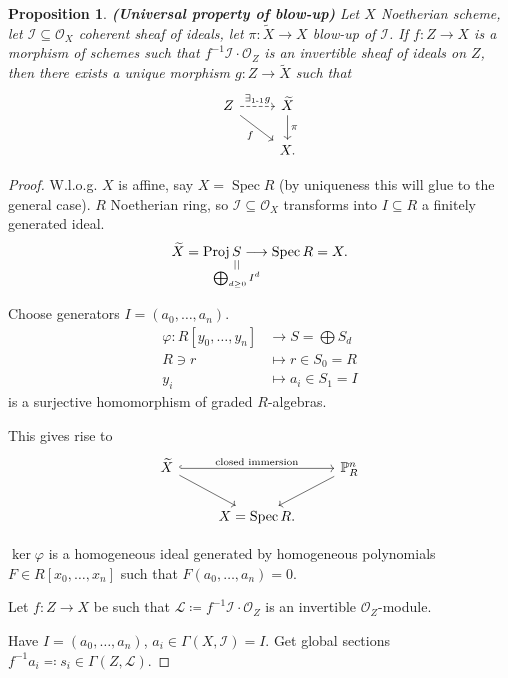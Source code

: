 \documentclass[12pt]{article}
\DeclareMathOperator{\Spec}{Spec}
\DeclareMathOperator{\Proj}{Proj}
\newtheorem*{proposition}{Proposition}
\theoremstyle{definition}
\theoremstyle{remark}
\begin{document}
\begin{proposition}
\emph{\textbf{(Universal property of blow-up)}} Let $X$ Noetherian scheme, let $\mathcal{I}\subseteq\mathcal{O}_X$ coherent sheaf of ideals, let $\pi:\widetilde{X}\rightarrow X$ blow-up of $\mathcal{I}$. If $f:Z\rightarrow X$ is a morphism of schemes such that $f^{-1}\mathcal{I}\cdot\mathcal{O}_Z$ is an invertible sheaf of ideals on $Z$, then there exists a unique morphism $g:Z\rightarrow\widetilde{X}$ such that
\[
\begin{tikzcd}
Z\arrow[r,dashed,"\exists_{1\text{-}1}g"]\arrow[rd,"f",swap]&\widetilde{X}\arrow[d,"\pi"]\\
&X.
\end{tikzcd}
\]
\end{proposition}

\begin{proof}
W.l.o.g. $X$ is affine, say $X=\Spec R$ (by uniqueness this will glue to the general case). $R$ Noetherian ring, so $\mathcal{I}\subseteq\mathcal{O}_X$ transforms into $I\subseteq R$ a finitely generated ideal.
\[\widetilde{X}=\Proj\underset{\mathclap{\substack{\\||\\\bigoplus_{d\geq0}I^d}}}{S}\longrightarrow\Spec R=X.\]

Choose generators $I=(a_0,\ldots,a_n)$.
\begin{align*}
\varphi:R[y_0,\ldots,y_n]&\longrightarrow S=\bigoplus S_d\\
R\ni r&\longmapsto r\in S_0=R\\
y_i&\longmapsto a_i\in S_1=I
\end{align*}
is a surjective homomorphism of graded $R$-algebras.

This gives rise to
\[
\begin{tikzcd}
\widetilde{X}\arrow[rr,hook,"\text{closed immersion}"]\arrow[rd]&&\mathbb{P}_R^n\arrow[ld]\\
&X=\Spec R.
\end{tikzcd}
\]

$\ker\varphi$ is a homogeneous ideal generated by homogeneous polynomials $F\in R[x_0,\ldots,x_n]$ such that $F(a_0,\ldots,a_n)=0$.

Let $f:Z\rightarrow X$ be such that $\mathcal{L}\coloneqq f^{-1}\mathcal{I}\cdot\mathcal{O}_Z$ is an invertible $\mathcal{O}_Z$-module.

Have $I=(a_0,\ldots,a_n)$, $a_i\in\Gamma(X,\mathcal{I})=I$. Get global sections $f^{-1}a_i\eqqcolon s_i\in\Gamma(Z,\mathcal{L})$.


\end{proof}
\end{document}
